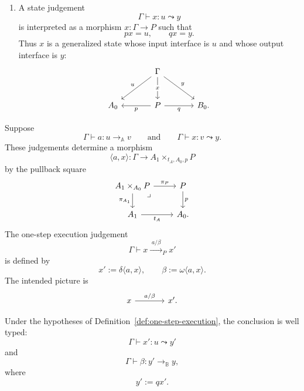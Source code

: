 \begin{definition}[Judgements]
\begin{enumerate}
        \item A state judgement
        \[
            \Gamma\vdash x:u\leadsto y
        \]
        is interpreted as a morphism \(x:\Gamma\to P\) such that
        \[
            px=u,
            \qquad
            qx=y.
        \]
        Thus \(x\) is a generalized state whose input interface is \(u\) and
        whose output interface is \(y\):
 \[
\begin{tikzcd}[column sep=large, row sep=large]
    &
    \Gamma
        \arrow[d, "x" description]
        \arrow[dl, "u"']
        \arrow[dr, "y"]
    &
    \\
    A_0
    &
    P
        \arrow[l, "p"]
        \arrow[r, "q"']
    &
    B_0 .
\end{tikzcd}
\]    \end{enumerate}
\end{definition}

\begin{definition}
\label{def:one-step-execution}
    Suppose
    \[
        \Gamma\vdash a:u\to_{\mathbb A}v
        \qquad
        \text{and}
        \qquad
        \Gamma\vdash x:v\leadsto y.
    \]
    These judgements determine a morphism
    \[
        \langle a,x\rangle:
        \Gamma\to A_1\times_{t_A,A_0,p}P
    \]
    by the pullback square
    \[
        \begin{tikzcd}
            A_1\times_{A_0}P
                \arrow[r, "\pi_P"]
                \arrow[d, "\pi_{A_1}"']
                \arrow[dr, phantom, "\lrcorner", very near start]
            &
            P \arrow[d, "p"]
            \\
            A_1 \arrow[r, "t_A"']
            &
            A_0 .
        \end{tikzcd}
    \]
    The one-step execution judgement
    \[
        \Gamma\vdash
        x\xrightarrow{\;a/\beta\;}_{P}x'
    \]
    is defined by
    \[
        x':=\delta\langle a,x\rangle,
        \qquad
        \beta:=\omega\langle a,x\rangle.
    \]
    The intended picture is
    \[
        \begin{tikzcd}[column sep=large]
            x
                \arrow[r, "{a/\beta}"]
            &
            x' .
        \end{tikzcd}
    \]
\end{definition}

\begin{proposition}
\label{prop:typing-one-step-execution}
    Under the hypotheses of Definition~\ref{def:one-step-execution}, the
    conclusion is well typed:
    \[
        \Gamma\vdash x':u\leadsto y'
    \]
    and
    \[
        \Gamma\vdash \beta:y'\to_{\mathbb B}y,
    \]
    where
    \[
        y':=qx'.
    \]
\end{proposition}

